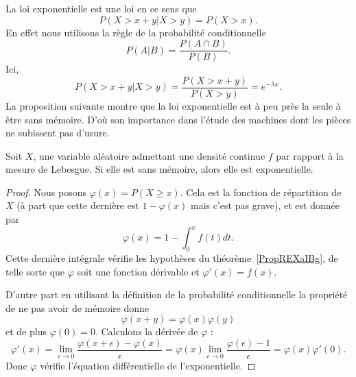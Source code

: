 La loi exponentielle est une loi  en ce sens que
\begin{equation}
	P(X>x+y|X>y)=P(X>x).
\end{equation}
En effet nous utilisons la règle de la probabilité conditionnelle
\begin{equation}
	P(A|B)=\frac{ P(A\cap B) }{ P(B) }.
\end{equation}
Ici,
\begin{equation}
	P(X>x+y|X>y)=\frac{ P(X>x+y) }{ P(X>y) }= e^{-\lambda x}.
\end{equation}
La proposition suivante montre que la loi exponentielle est à peu près la seule à être sans mémoire. D'où son importance dans l'étude des machines dont les pièces ne subissent pas d'usure.

\begin{proposition} \label{PropREXaIBg}
	Soit \( X\), une variable aléatoire admettant une densité continue \( f\) par rapport à la mesure de Lebesgue. Si elle est sans mémoire, alors elle est exponentielle.
\end{proposition}

\begin{proof}
	Nous posons \( \varphi(x)=P(X\geq x)\). Cela est la fonction de répartition de \( X\) (à part que cette dernière est \( 1-\varphi(x)\) mais c'est pas grave), et est donnée par
	\begin{equation}
		\varphi(x)=1-\int_0^xf(t)dt.
	\end{equation}
	Cette dernière intégrale vérifie les hypothèses du théorème~\ref{PropREXaIBg}, de telle sorte que \( \varphi\) soit une fonction dérivable et \( \varphi'(x)=f(x)\).

	D'autre part en utilisant la définition de la probabilité conditionnelle la propriété de ne pas avoir de mémoire donne
	\begin{equation}
		\varphi(x+y)=\varphi(x)\varphi(y)
	\end{equation}
	et de plus \( \varphi(0)=0\). Calculons la dérivée de \( \varphi\) :
	\begin{equation}
		\varphi'(x)=\lim_{\epsilon\to 0}\frac{ \varphi(x+\epsilon)-\varphi(x) }{ \epsilon }=\varphi(x)\lim_{\epsilon\to 0}\frac{ \varphi(\epsilon)-1 }{ \epsilon }=\varphi(x)\varphi'(0).
	\end{equation}
	Donc \( \varphi\) vérifie l'équation différentielle de l'exponentielle.

\end{proof}

